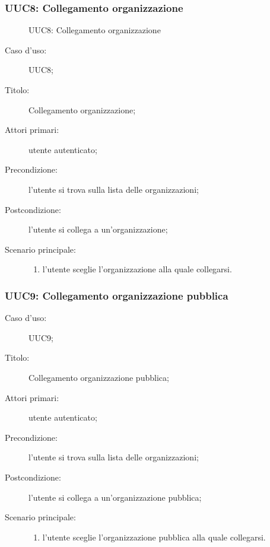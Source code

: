 \documentclass[../../../analisi-dei-requisiti.tex]{subfiles}
\begin{document}
\subsubsection{UUC8: Collegamento organizzazione}%
\label{subs:UUC8}

\begin{figure}[H]
  \centering
  \caption{UUC8: Collegamento organizzazione}%
  \label{fig:UUC8}
\end{figure}



\begin{description}
  \item[Caso d’uso:] UUC8;
  \item[Titolo:] Collegamento organizzazione;
  \item[Attori primari:] utente autenticato;
  \item[Precondizione:] l'utente si trova sulla lista delle organizzazioni;
  \item[Postcondizione:] l'utente si collega a un'organizzazione;
  \item[Scenario principale:]
        \begin{enumerate}
          \item l'utente sceglie l'organizzazione alla quale collegarsi.
        \end{enumerate}
\end{description}

\subsubsection{UUC9: Collegamento organizzazione pubblica}%
\label{subs:UUC9}

\begin{description}
  \item[Caso d’uso:] UUC9;
  \item[Titolo:] Collegamento organizzazione pubblica;
  \item[Attori primari:] utente autenticato;
  \item[Precondizione:] l'utente si trova sulla lista delle organizzazioni;
  \item[Postcondizione:] l'utente si collega a un'organizzazione pubblica;
  \item[Scenario principale:]
        \begin{enumerate}
          \item l'utente sceglie l'organizzazione pubblica alla quale collegarsi.
        \end{enumerate}
\end{description}
\end{document}
